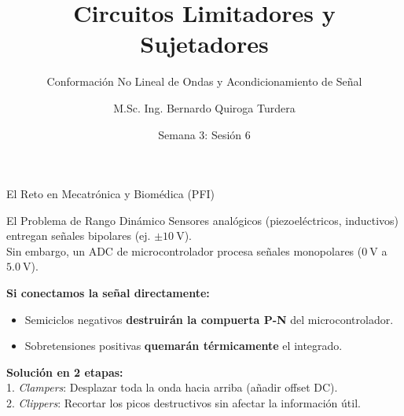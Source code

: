 \documentclass[10pt, aspectratio=169]{beamer}
\title[Clippers y Clampers]{Circuitos Limitadores y Sujetadores}
\subtitle{Conformación No Lineal de Ondas y Acondicionamiento de Señal}
\author{M.Sc. Ing. Bernardo Quiroga Turdera}
\institute[UCB Tarija]{Circuitos Electrónicos III (IMT-221)}
\date{Semana 3: Sesión 6}
\begin{document}
\begin{frame}
  \titlepage
\end{frame}

\begin{frame}{El Reto en Mecatrónica y Biomédica (PFI)}
  \begin{block}{El Problema de Rango Dinámico}
      Sensores analógicos (piezoeléctricos, inductivos) entregan señales bipolares (ej. $\pm\qty{10}{\volt}$). \\
      Sin embargo, un ADC de microcontrolador procesa señales monopolares ($\qty{0}{\volt}$ a $\qty{+5.0}{\volt}$).
  \end{block}
  \vspace{0.2cm}
  \alert{\textbf{Si conectamos la señal directamente:}}\\
  \begin{itemize}
      \item Semiciclos negativos \textbf{destruirán la compuerta P-N} del microcontrolador.
      \item Sobretensiones positivas \textbf{quemarán térmicamente} el integrado.
  \end{itemize}
  \vspace{0.2cm}
  \textbf{Solución en 2 etapas:}\\
  1. \textit{Clampers}: Desplazar toda la onda hacia arriba (añadir offset DC).\\
  2. \textit{Clippers}: Recortar los picos destructivos sin afectar la información útil.
\end{frame}
\end{document}
